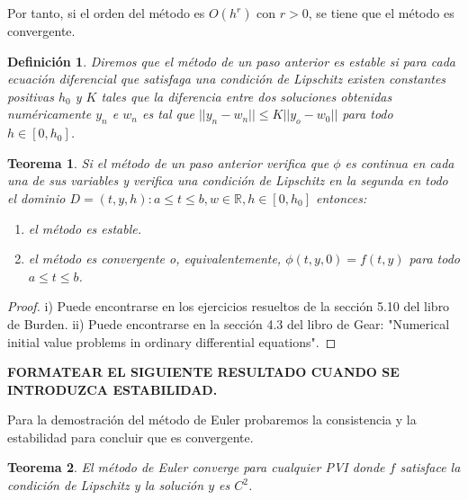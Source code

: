 \documentclass{article}
\theoremstyle{theorem-style}  %
\newtheorem{theorem}{Teorema}[section]  %
\theoremstyle{definition-style}
\newtheorem{definition}{Definición}[section]
\theoremstyle{example-style}
\begin{document}
	Por tanto, si el orden del método es $O(h^r)$ con $r > 0$, se tiene que el método es convergente.
	
	\begin{definition}
		Diremos que el método de un paso anterior es estable si para cada ecuación diferencial que satisfaga una condición de Lipschitz existen constantes positivas $h_0$ y $K$ tales que la diferencia entre dos soluciones obtenidas numéricamente $y_n$ e $w_n$ es tal que $||y_n-w_n|| \leq K ||y_o-w_0||$ para todo $h \in [0,h_0]$.
	\end{definition}
	
	\begin{theorem}
		Si el método de un paso anterior verifica que $\phi$ es continua en cada una de sus variables y verifica una condición de Lipschitz en la segunda en todo el dominio $D={(t,y,h):a \leq t \leq b, w \in \mathbb{R}, h \in [0,h_0]}$ entonces:
		\begin{enumerate}
			\item el método es estable. 
			\item el método es convergente o, equivalentemente, $\phi(t,y,0)=f(t,y)$ para todo $a \leq t \leq b$.
		\end{enumerate}		
	\end{theorem}
	
	\begin{proof}
		i) Puede encontrarse en los ejercicios resueltos de la sección 5.10 del libro de Burden. ii) Puede encontrarse en la sección 4.3 del libro de Gear: "Numerical initial value problems in ordinary differential equations".
	\end{proof}
	
	\textbf{FORMATEAR EL SIGUIENTE RESULTADO CUANDO SE INTRODUZCA ESTABILIDAD.}

	Para la demostración del método de Euler probaremos la consistencia y la estabilidad para concluir que es convergente.
	
	\begin{theorem}
		El método de Euler converge para cualquier PVI donde $f$ satisface la condición de Lipschitz y la solución $y$ es $C^2$.
	\end{theorem}
	
\end{document}
